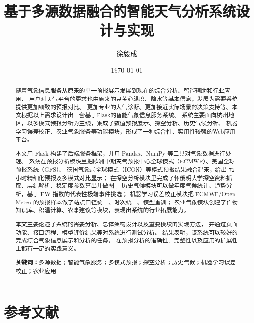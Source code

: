 \documentclass[12pt,a4paper]{ctexart}
\title{基于多源数据融合的智能天气分析系统设计与实现}
\author{徐毅成}
\date{\today}
\begin{document}
\maketitle

\begin{abstract}
随着气象信息服务从原来的单一预报展示发展到现在的综合分析、智能辅助和行业应用，
用户对天气平台的要求也由原来的只关心温度、降水等基本信息，发展为需要系统提供更加细致的预报对比、
更加专业的大气诊断、更加接近实际场景的决策支持等。本文根据以上需求设计出一套基于Flask的智能气象信息服务系统。
系统主要面向杭州地区，以多模式预报分析为主线，集成了数值预报展示、探空分析、历史气候分析、
机器学习误差校正、农业气象服务等功能模块，形成了一种综合性、实用性较强的Web应用平台。

本文用 Flask 构建了后端服务框架，并用 Pandas、NumPy 等工具对气象数据进行处理。
系统在预报分析模块里把欧洲中期天气预报中心全球模式（ECMWF）、美国全球预报系统（GFS）、
德国气象局全球模式（ICON）等模式预报结果融合起来，给出 72 小时精细化预报及多模式对比显示；
在探空分析模块里完成了怀俄明大学探空资料抓取、层结解析、稳定度参数算出并做图；
历史气候模块可以做年度气候统计、趋势分析，基于 EW 指数的代表性极端事件挑选；
机器学习误差校正模块把 ECMWF/Open-Meteo 的预报样本做了站点口径统一、时次统一、模型重训；
农业气象模块创建了作物知识库、积温计算、农事建议等模块，表现出系统的行业拓展能力。

本文主要论述了系统的需要分析、总体架构设计以及重要模块的实现方法，
并通过页面功能、接口流程、模型评价结果等对系统进行测试分析。
结果表明，该系统可以较好的完成综合气象信息展示和分析的任务，
在预报分析的准确性、完整性以及应用的扩展性上都有一定的实践意义。

\textbf{关键词：}多源数据；智能气象服务；多模式预报；探空分析；历史气候；机器学习误差校正；农业应用
\end{abstract}

\tableofcontents
\newpage









\section*{参考文献}
\end{document}
